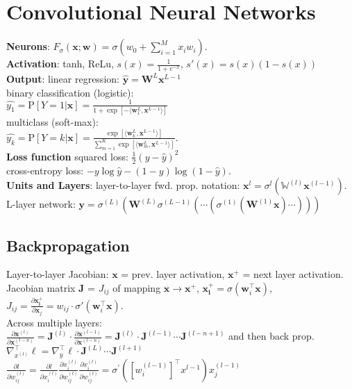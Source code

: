 \section{Convolutional Neural Networks}
\textbf{Neurons}: $F_\sigma(\mathbf{x};\mathbf{w}) = \sigma(w_0 + \sum_{i=1}^M{x_iw_i})$.\\
\textbf{Activation}: tanh, ReLu, $s(x)=\frac{1}{1+e^{-x}}$, $s'(x)=s(x)(1-s(x))$\\
\textbf{Output}: linear regression: $\hat{\mathbf{y}} = \mathbf{W}^L\mathbf{x}^{L-1}$\\
binary classification (logistic):\\
$\hat{y_1} = \text{P}[Y=1|\mathbf{x}] = \frac{1}{1 + \exp[-\langle \mathbf{w}_1^L,\mathbf{x}^{L-1}\rangle]}$\\
multiclass (soft-max):\\
$\hat{y_k} = \text{P}[Y=k|\mathbf{x}]= \frac{\exp[\langle \mathbf{w}_k^L,\mathbf{x}^{L-1}\rangle]}{\sum_{m=1}^{K}{\exp[\langle \mathbf{w}_m^L, \mathbf{x}^{L-1}\rangle]}}$.\\
\textbf{Loss function} squared loss: $\frac{1}{2}(y - \hat{y})^2$\\
cross-entropy loss: $-y \log \hat{y} - (1-y)\log(1-\hat{y})$.\\
\textbf{Units and Layers}: layer-to-layer fwd. prop. notation: $\mathbf{x}^{l} = \sigma^{l}\left(\mathbb{W}^{\left(l\right)}\mathbf{x}^{\left(l-1\right)}\right)$. L-layer network: $\mathbf{y}=\sigma^{\left(L\right)}\left(\mathbf{W}^(L)\sigma^{(L-1)}\left(\cdots\left(\sigma^{(1)}\left(\mathbf{W}^{(1)}\mathbf{x}\right)\cdots\right)\right)\right)$

\subsection*{Backpropagation}
Layer-to-layer Jacobian: $\mathbf{x}$ = prev. layer activation, $\mathbf{x^+}$ = next layer activation. Jacobian matrix $\mathbf{J}$ = $J_{ij}$ of mapping $\mathbf{x}\rightarrow\mathbf{x^+}$, $\mathbf{x_i^+} = \sigma(\mathbf{w}_i^\top\mathbf{x})$, $J_{ij} = \frac{\partial \mathbf{x_i^+}}{\partial \mathbf{x}_j} = w_{ij}\cdot\sigma'(\mathbf{w}_i^\top\mathbf{x})$.\\
Across multiple layers:\\
$\frac{\partial\mathbf{x}^{(l)}}{\partial\mathbf{x}^{(l-n)}} = \mathbf{J}^{(l)}\cdot\frac{\partial\mathbf{x}^{(l-1)}}{\partial\mathbf{x}^{(l-n)}}=\mathbf{J}^{(l)}\cdot\mathbf{J}^{(l-1)}\cdots\mathbf{J}^{(l-n+1)}$ and then back prop. $ \nabla_{x^{(l)}}^\top\ell=\nabla_{y}^\top\ell\cdot\mathbf{J}^{(L)}\cdots\mathbf{J}^{(l+1)}$\\
$\frac{\partial l}{\partial w_{ij}^{(l)}} = \frac{\partial l}{\partial x_{i}^{(l)}} \frac{\partial x_{i}^{(l)}}{\partial w_{ij}^{(l)}}$\quad $\frac{\partial x_{i}^{(l)}}{\partial w_{ij}^{(l)}} = \sigma^{'}([w_i^{(l-1)}]^\top x^{l-1}) x_j^{(l-1)}$

